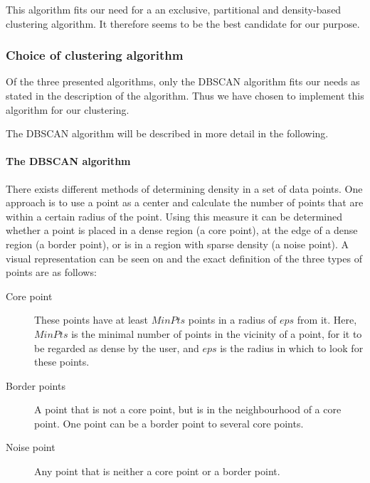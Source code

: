 This algorithm fits our need for a an exclusive, partitional and density-based clustering algorithm.
It therefore seems to be the best candidate for our purpose.

\subsubsection{Choice of clustering algorithm}\label{clustering:DBSCAN}
Of the three presented algorithms, only the DBSCAN algorithm fits our needs as stated in the description of the algorithm.
Thus we have chosen to implement this algorithm for our clustering.

\noindent
The DBSCAN algorithm will be described in more detail in the following.

\paragraph{The DBSCAN algorithm}
There exists different methods of determining density in a set of data points.
One approach is to use a point as a center and calculate the number of points that are within a certain radius of the point.
Using this measure it can be determined whether a point is placed in a dense region (a core point), at the edge of a dense region (a border point), or is in a region with sparse density (a noise point).
A visual representation can be seen on  and the exact definition of the three types of points are as follows\cite{pang2006introduction}:

\begin{description}
\item[Core point] These points have at least $ MinPts $ points in a radius of $ eps $ from it.
Here, $ MinPts $ is the minimal number of points in the vicinity of a point, for it to be regarded as dense by the user, and $ eps $ is the radius in which to look for these points.

\item[Border points] A point that is not a core point, but is in the neighbourhood of a core point. 
One point can be a border point to several core points.

\item[Noise point] Any point that is neither a core point or a border point. 
\end{description}

